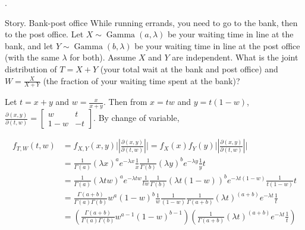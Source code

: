 \documentclass[8pt]{beamer}
\newcommand{\abs}[1]{\left\lvert #1 \right\rvert}
\newcommand{\GammaDist}[2]{\operatorname{Gamma}\!\left(#1, #2\right)}
\begin{document}
\begin{frame}{.}
    \begin{block}{Story. Bank-post office}
        While running errands, you need to go to the bank, then to the post office. Let $X \sim \GammaDist{a}{\lambda}$ be your waiting time in line at the bank, and let $Y \sim \GammaDist{b}{\lambda}$ be your waiting time in line at the post office (with the same $\lambda$ for both). Assume $X$ and $Y$ are independent. What is the joint distribution of $T=X+Y$ (your total wait at the bank and post office) and $W = \frac{X}{X+Y}$ (the fraction of your waiting time spent at the bank)?
    \end{block}

    Let $t=x+y$ and $w=\frac{x}{x+y}$. Then from $x = tw$ and $y=t(1-w)$, $\frac{\partial (x,y)}{\partial (t,w)} = \left[\begin{matrix}
        w & t \\ 1-w & -t
    \end{matrix}\right]$. By change of variable,

    
    \[
    \begin{aligned}
        f_{T,W}(t,w) &= f_{X,Y}(x,y) \vert \abs{\frac{\partial (x,y)}{\partial (t,w)}} \vert = f_X (x) f_Y(y) \vert \abs{\frac{\partial(x,y)}{\partial(t,w)}}\vert\\
        &= \frac{1}{\Gamma(a)} (\lambda x)^{a} e^{-\lambda x} \frac{1}{x} \frac{1}{\Gamma(b)} (\lambda y)^{b} e^{-\lambda y} \frac{1}{y} t \\
        &= \frac{1}{\Gamma(a)} (\lambda t w)^a e^{-\lambda t w} \frac{1}{tw} \frac{1}{\Gamma(b)} (\lambda t(1-w))^b e^{-\lambda t(1-w)} \frac{1}{t(1-w)} t \\
        &= \frac{\Gamma(a+b)}{\Gamma(a) \Gamma(b)} w^a  (1-w)^b \frac{1}{w} \frac{1}{(1-w)} \frac{1}{\Gamma(a+b)}(\lambda t)^{(a+b)} e^{-\lambda t} \frac{1}{t} \\
        &= \left(\frac{\Gamma(a+b)}{\Gamma(a) \Gamma(b)} w^{a-1} (1-w)^{b-1} \right) \left( \frac{1}{\Gamma(a+b)} (\lambda t)^{(a+b)} e^{-\lambda t} \frac{1}{t} \right)
    \end{aligned}
    \]
\end{frame}
\end{document}
